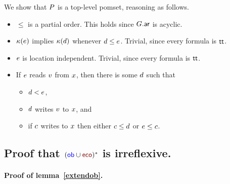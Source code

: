 We show that $P$ is a top-level pomset, reasoning as follows.
\begin{itemize}
\item ${\le}$ is a partial order.  This holds since $G.{\mathrel{\mathsf{ar}}}$ is acyclic.

\item $\kappa(e)$ implies $\kappa(d)$ whenever
  $d\le e$.   Trivial, since every formula is $\mathsf{tt}$.

\item $e$ is location independent. Trivial, since every formula is $\mathsf{tt}$.
\item If $e$ reads $v$ from $x$, then there is some $d$ such that
  \begin{itemize}
  \item $d < e$,  
  \item $d$ writes $v$ to $x$, and
  \item if $c$ writes to $x$
    then either $c \leq d$ or $e \leq c$.
  \end{itemize}    
\end{itemize}

\subsection{Proof that  $({\rob} \cup {\reco})^*$ is irreflexive. }

\paragraph*{Proof of lemma~\ref{extendob}. } 


